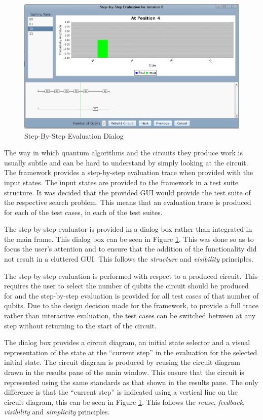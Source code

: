 \begin{figure}
 \includegraphics[width=\textwidth]{StepByStepEval.jpg}
\caption{Step-By-Step Evaluation Dialog}
\label{fig:StepByStepEval}
\end{figure}
The way in which quantum algorithms and the circuits they produce work is usually subtle and can be hard to understand by simply looking at the circuit.
The framework provides a step-by-step evaluation trace when provided with the input states.
The input states are provided to the framework in a test suite structure.
It was decided that the provided GUI would provide the test suite of the respective search problem.
This means that an evaluation trace is produced for each of the test cases, in each of the test suites.

The step-by-step evaluator is provided in a dialog box rather than integrated in the main frame.
This dialog box can be seen in Figure \ref{fig:StepByStepEval}.
This was done so as to focus the user's attention and to ensure that the addition of the functionality did not result in a cluttered GUI.
This follows the \emph{structure} and \emph{visibility} principles.

The step-by-step evaluation is performed with respect to a produced circuit.
This requires the user to select the number of qubits the circuit should be produced for and the step-by-step evaluation is provided for all test cases of that number of qubits.
Due to the design decision made for the framework, to provide a full trace rather than interactive evaluation, the test cases can be switched between at any step without returning to the start of the circuit.

The dialog box provides a circuit diagram, an initial state selector and a visual representation of the state at the ``current step'' in the evaluation for the selected initial state.
The circuit diagram is produced by reusing the circuit diagram drawn in the results pane of the main window.
This ensure that the circuit is represented using the same standards as that shown in the results pane.
The only difference is that the ``current step'' is indicated using a vertical line on the circuit diagram, this can be seen in Figure \ref{fig:StepByStepEval}.
This follows the \emph{reuse}, \emph{feedback},  \emph{visibility} and \emph{simplicity} principles.

